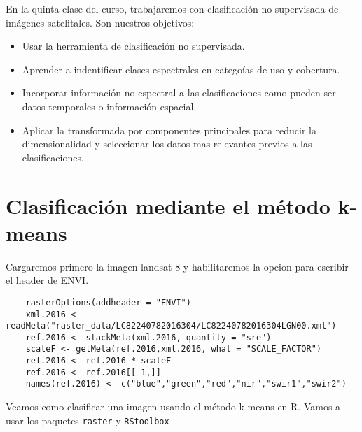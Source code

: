 En la quinta clase del curso, trabajaremos con clasificaci\'on no supervisada
de im\'agenes satelitales. Son nuestros objetivos:

\begin{itemize}
  \item Usar la herramienta de clasificaci\'on no supervisada.
  \item Aprender a indentificar clases espectrales en catego\'ias de uso y cobertura.
  \item Incorporar informaci\'on no espectral a las clasificaciones como
  pueden ser datos temporales o informaci\'on espacial.
  \item Aplicar la transformada por componentes principales para reducir la dimensionalidad
  y seleccionar los datos mas relevantes previos a las clasificaciones.
\end{itemize}

\section{Clasificaci\'on mediante el m\'etodo k-means}

Cargaremos primero la imagen landsat 8 y habilitaremos la opcion para escribir
el header de ENVI\@.

\begin{lstlisting}
    rasterOptions(addheader = "ENVI")
    xml.2016 <- readMeta("raster_data/LC82240782016304/LC82240782016304LGN00.xml")
    ref.2016 <- stackMeta(xml.2016, quantity = "sre")
    scaleF <- getMeta(ref.2016,xml.2016, what = "SCALE_FACTOR")
    ref.2016 <- ref.2016 * scaleF
    ref.2016 <- ref.2016[[-1,]]
    names(ref.2016) <- c("blue","green","red","nir","swir1","swir2")
\end{lstlisting}

Veamos como clasificar una imagen usando el m\'etodo k-means en R. Vamos a usar
los paquetes \texttt{raster} y \texttt{RStoolbox}

